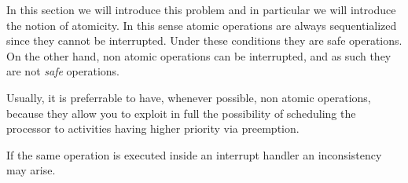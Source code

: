 In this section we will introduce this problem and in particular we will introduce the notion of atomicity.
In this sense atomic operations are always sequentialized since they cannot be interrupted. Under these conditions they are safe operations.\\
On the other hand, non atomic operations can be interrupted, and as such they are not \textit{safe} operations.

Usually, it is preferrable to have, whenever possible, non atomic operations, because they allow you to exploit in full the possibility of scheduling the processor to activities having higher priority via preemption.

If the same operation is executed inside an interrupt handler an inconsistency may arise.

